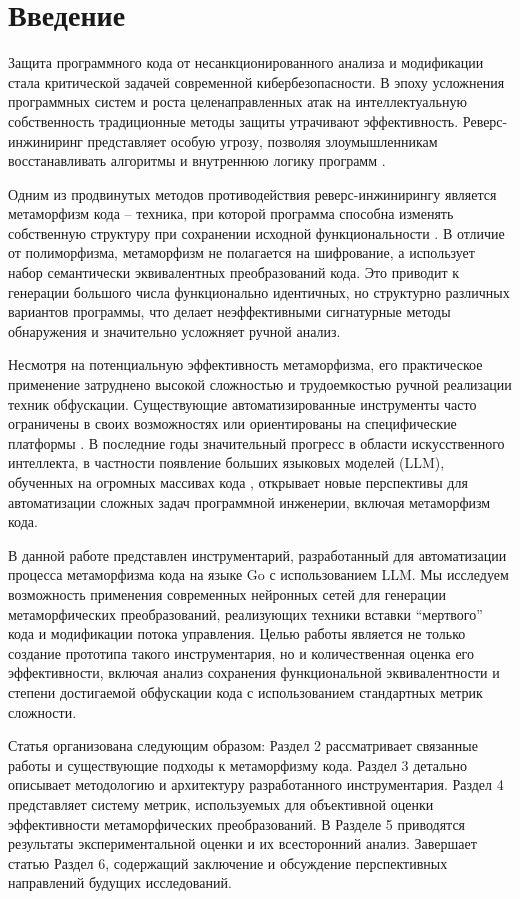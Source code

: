 
\section{Введение}
\label{sec:intro}
Защита программного кода от несанкционированного анализа и модификации стала критической задачей современной кибербезопасности. В эпоху усложнения программных систем и роста целенаправленных атак на интеллектуальную собственность традиционные методы защиты утрачивают эффективность. Реверс-инжиниринг представляет особую угрозу, позволяя злоумышленникам восстанавливать алгоритмы и внутреннюю логику программ \cite{Collberg97Survey}.

Одним из продвинутых методов противодействия реверс-инжинирингу является метаморфизм кода – техника, при которой программа способна изменять собственную структуру при сохранении исходной функциональности \cite{Szor05Metamorphic}. В отличие от полиморфизма, метаморфизм не полагается на шифрование, а использует набор семантически эквивалентных преобразований кода. Это приводит к генерации большого числа функционально идентичных, но структурно различных вариантов программы, что делает неэффективными сигнатурные методы обнаружения и значительно усложняет ручной анализ.

Несмотря на потенциальную эффективность метаморфизма, его практическое применение затруднено высокой сложностью и трудоемкостью ручной реализации техник обфускации. Существующие автоматизированные инструменты часто ограничены в своих возможностях или ориентированы на специфические платформы \cite{Schrittwieser16Survey}. В последние годы значительный прогресс в области искусственного интеллекта, в частности появление больших языковых моделей (LLM), обученных на огромных массивах кода \cite{Chen21Evaluating}, открывает новые перспективы для автоматизации сложных задач программной инженерии, включая метаморфизм кода.

В данной работе представлен инструментарий, разработанный для автоматизации процесса метаморфизма кода на языке Go с использованием LLM. Мы исследуем возможность применения современных нейронных сетей для генерации метаморфических преобразований, реализующих техники вставки \enquote{мертвого} кода и модификации потока управления. Целью работы является не только создание прототипа такого инструментария, но и количественная оценка его эффективности, включая анализ сохранения функциональной эквивалентности и степени достигаемой обфускации кода с использованием стандартных метрик сложности.

Статья организована следующим образом: Раздел 2 рассматривает связанные работы и существующие подходы к метаморфизму кода. Раздел 3 детально описывает методологию и архитектуру разработанного инструментария. Раздел 4 представляет систему метрик, используемых для объективной оценки эффективности метаморфических преобразований. В Разделе 5 приводятся результаты экспериментальной оценки и их всесторонний анализ. Завершает статью Раздел 6, содержащий заключение и обсуждение перспективных направлений будущих исследований.
